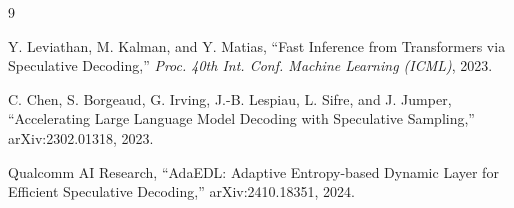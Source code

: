 \documentclass[conference]{IEEEtran}
\begin{document}

\begin{thebibliography}{9}

Y. Leviathan, M. Kalman, and Y. Matias,
``Fast Inference from Transformers via Speculative Decoding,''
\emph{Proc. 40th Int. Conf. Machine Learning (ICML)}, 2023.

C. Chen, S. Borgeaud, G. Irving, J.-B. Lespiau, L. Sifre, and J. Jumper,
``Accelerating Large Language Model Decoding with Speculative Sampling,''
arXiv:2302.01318, 2023.

Qualcomm AI Research,
``AdaEDL: Adaptive Entropy-based Dynamic Layer for Efficient Speculative Decoding,''
arXiv:2410.18351, 2024.

\end{thebibliography}
\end{document}
